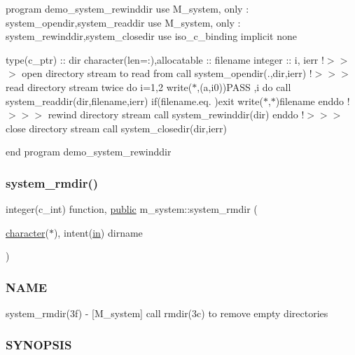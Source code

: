 program demo\+\_\+system\+\_\+rewinddir use M\+\_\+system, only \+: system\+\_\+opendir,system\+\_\+readdir use M\+\_\+system, only \+: system\+\_\+rewinddir,system\+\_\+closedir use iso\+\_\+c\+\_\+binding implicit none

type(c\+\_\+ptr) \+:\+: dir character(len=\+:),allocatable \+:\+: filename integer \+:\+: i, ierr !$>$$>$$>$ open directory stream to read from call system\+\_\+opendir(\textquotesingle{}.\textquotesingle{},dir,ierr) !$>$$>$$>$ read directory stream twice do i=1,2 write($\ast$,\textquotesingle{}(a,i0)\textquotesingle{})\textquotesingle{}P\+A\+SS \textquotesingle{},i do call system\+\_\+readdir(dir,filename,ierr) if(filename.\+eq.\textquotesingle{} \textquotesingle{})exit write($\ast$,$\ast$)filename enddo !$>$$>$$>$ rewind directory stream call system\+\_\+rewinddir(dir) enddo !$>$$>$$>$ close directory stream call system\+\_\+closedir(dir,ierr)

end program demo\+\_\+system\+\_\+rewinddir \mbox{\label{namespacem__system_a21fd3e1ccd50cef6adc539ef3d7a9836}} 
\subsubsection{\texorpdfstring{system\+\_\+rmdir()}{system\_rmdir()}}
{\footnotesize\ttfamily integer(c\+\_\+int) function, \hyperlink{M__stopwatch_83_8txt_a2f74811300c361e53b430611a7d1769f}{public} m\+\_\+system\+::system\+\_\+rmdir (\begin{DoxyParamCaption}\item[{\hyperlink{option__stopwatch_83_8txt_abd4b21fbbd175834027b5224bfe97e66}{character}($\ast$), intent(\hyperlink{M__journal_83_8txt_afce72651d1eed785a2132bee863b2f38}{in})}]{dirname }\end{DoxyParamCaption})}



\subsubsection*{N\+A\+ME}

system\+\_\+rmdir(3f) -\/ \mbox{[}M\+\_\+system\mbox{]} call rmdir(3c) to remove empty directories \subsubsection*{S\+Y\+N\+O\+P\+S\+IS}

